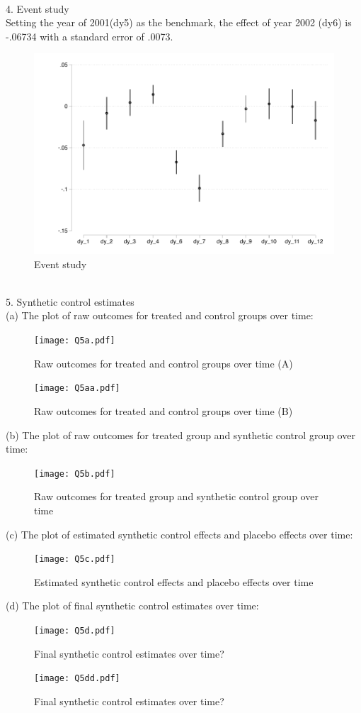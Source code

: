 \documentclass{article}
\begin{document}
\noindent
\\
4. Event study
\\ Setting the year of 2001(dy5) as the benchmark, the effect of year 2002 (dy6) is -.06734 with a standard error of .0073.
\smallskip
\begin{figure}[H]
    \centering
    \includegraphics[scale = 0.7]{Q4.pdf}
    \caption{Event study}
    \label{fig:Q1}
\end{figure}

\noindent
\\
5. Synthetic control estimates
\bigskip
\\(a) The plot of raw outcomes for treated and control groups over time:
\smallskip
\begin{figure}[H]
    \centering
    \texttt{[image: Q5a.pdf]}
    \caption{Raw outcomes for treated and control groups over time (A)}
    \label{fig:Q5a}
\end{figure}
\smallskip
\begin{figure}[H]
    \centering
    \texttt{[image: Q5aa.pdf]}
    \caption{Raw outcomes for treated and control groups over time (B)}
    \label{fig:Q5aa}
\end{figure}
(b) The plot of raw outcomes for treated group and synthetic control group over time:
\smallskip
\begin{figure}[H]
    \centering
    \texttt{[image: Q5b.pdf]}
    \caption{Raw outcomes for treated group and synthetic control group over time}
    \label{fig:Q5b}
\end{figure}
(c) The plot of estimated synthetic control effects and placebo effects over time:
\smallskip
\begin{figure}[H]
    \centering
    \texttt{[image: Q5c.pdf]}
    \caption{Estimated synthetic control effects and placebo effects over time}
    \label{fig:Q5c}
\end{figure}
(d) The plot of final synthetic control estimates over time:
\smallskip
\begin{figure}[H]
    \centering
    \texttt{[image: Q5d.pdf]}
    \caption{Final synthetic control estimates over time?}
    \label{fig:Q5d}
\end{figure}
\smallskip
\begin{figure}[H]
    \centering
    \texttt{[image: Q5dd.pdf]}
    \caption{Final synthetic control estimates over time?}
    \label{fig:Q5dd}
\end{figure}
\end{document}
